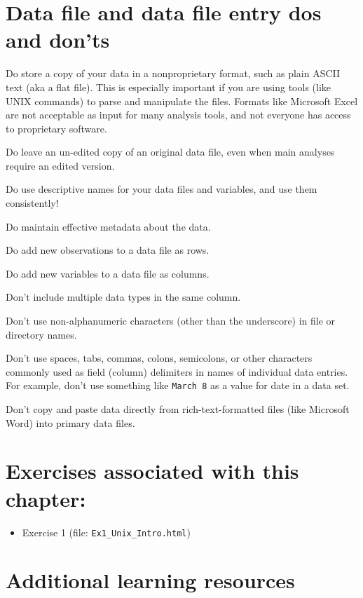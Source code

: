\documentclass[
]{book}
\providecommand{\tightlist}{%
  \setlength{\itemsep}{0pt}\setlength{\parskip}{0pt}}
\begin{document}
\hypertarget{data-file-and-data-file-entry-dos-and-donts}{%
\section{Data file and data file entry dos and don'ts}\label{data-file-and-data-file-entry-dos-and-donts}}

Do store a copy of your data in a nonproprietary format, such as plain ASCII text (aka a flat file). This is especially important if you are using tools (like UNIX commands) to parse and manipulate the files. Formats like Microsoft Excel are not acceptable as input for many analysis tools, and not everyone has access to proprietary software.

Do leave an un-edited copy of an original data file, even when main analyses require an edited version.

Do use descriptive names for your data files and variables, and use them consistently!

Do maintain effective metadata about the data.

Do add new observations to a data file as rows.

Do add new variables to a data file as columns.

Don't include multiple data types in the same column.

Don't use non-alphanumeric characters (other than the underscore) in file or directory names.

Don't use spaces, tabs, commas, colons, semicolons, or other characters commonly used as field (column) delimiters in names of individual data entries. For example, don't use something like \texttt{March\ 8} as a value for date in a data set.

Don't copy and paste data directly from rich-text-formatted files (like Microsoft Word) into primary data files.

\hypertarget{exercises-associated-with-this-chapter}{%
\section{Exercises associated with this chapter:}\label{exercises-associated-with-this-chapter}}

\begin{itemize}
\tightlist
\item
  Exercise 1 (file: \texttt{Ex1\_Unix\_Intro.html})
\end{itemize}

\hypertarget{additional-learning-resources}{%
\section{Additional learning resources}\label{additional-learning-resources}}
\end{document}
